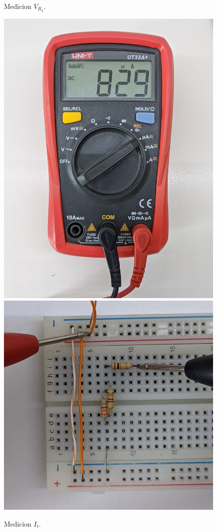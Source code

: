 \documentclass[a4paper,12pt, spanish]{report}
\begin{document}
\begin{figure}[H]
\begin{minipage}{0.3\textwidth}
            \caption{Medicion $V_{R_2}$.}
          \end{minipage}
          \begin{minipage}{0.3\textwidth}
            \centering
            \includegraphics[width=1\linewidth]{pictures/mult-it.jpg}
            \includegraphics[width=1\linewidth]{pictures/prot-it.jpg}
            \caption{Medicion $I_t$.}
          \end{minipage}
      \end{figure}
\end{document}
